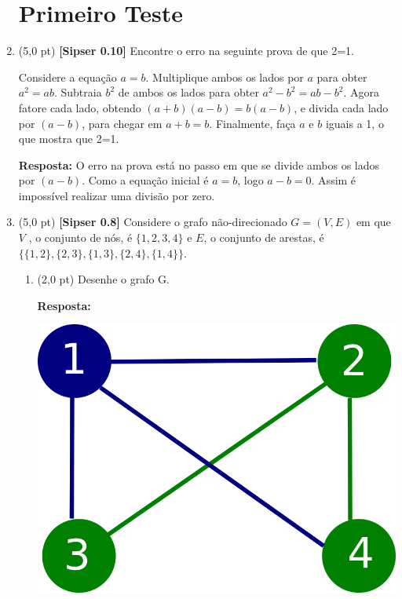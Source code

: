 \documentclass[12pt,a4paper,oneside]{article}
\begin{document}
\begin{enumerate}
	
	\section*{Primeiro Teste}
	
	\item (5,0 pt) {\bf [Sipser 0.10]} Encontre o erro na seguinte prova de que 2=1.
	\begin{flushleft}
		Considere a equação $a=b$. Multiplique ambos os lados por $a$ para obter $a^2 = ab$. Subtraia $b^2$ de ambos os lados para obter $a^2 - b^2 = ab-b^2$. Agora fatore cada lado, obtendo $(a+b)(a-b) = b(a-b)$, e divida cada lado por $(a-b)$, para chegar em $a+b = b$. Finalmente, faça $a$ e $b$ iguais a 1, o que mostra que 2=1.
	\end{flushleft}
	
	{\color{blue} {\bf Resposta: } O erro na prova está no passo em que se divide ambos os lados por $(a-b)$. Como a equação inicial é $a=b$, logo $a-b = 0$. Assim é impossível realizar uma divisão por zero.
	}
	
	\vspace{0.3cm}
	
	\item (5,0 pt) {\bf [Sipser 0.8]} Considere o grafo não-direcionado $G = (V, E)$ em que $V$ , o conjunto de nós, é $\{1, 2, 3, 4\}$ e $E$, o conjunto de arestas, é $\{\{1, 2\}, \{2, 3\}, \{1, 3\}, \{2, 4\}, \{1, 4\}\}$.
\begin{enumerate}
	\item (2,0 pt) Desenhe o grafo G. 
	
	\vspace*{0.3cm}
	
	{ \color{blue} {\bf Resposta:}
		
		\begin{center}
			\includegraphics[width=.5\textwidth]{imagens/grafo}
		\end{center}
		
}
\end{enumerate}
\end{enumerate}
\end{document}
